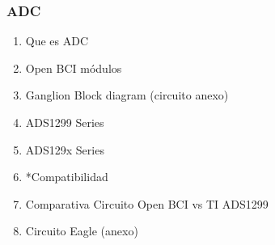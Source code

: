 \documentclass[11pt]{article}
\begin{document}
\subsubsection{ADC}
\label{sec:org3bdf615}
\begin{enumerate}
\item Que es ADC\\
\item Open BCI módulos\\
\item Ganglion Block diagram (circuito anexo)\\
\item ADS1299 Series\\
\item ADS129x Series\\
\item *Compatibilidad\\
\item Comparativa Circuito Open BCI vs TI ADS1299\\
\item Circuito Eagle (anexo)\\
\end{enumerate}
\end{document}
